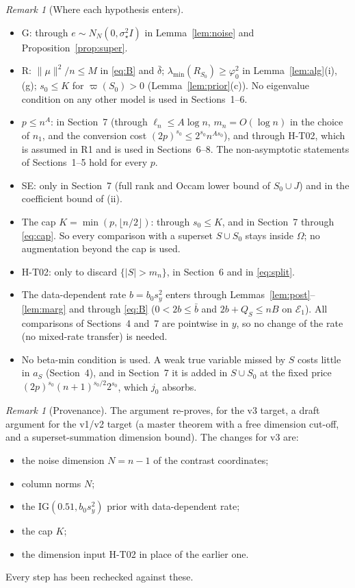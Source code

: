 \documentclass[11pt]{article}
\theoremstyle{remark}
\newtheorem{remark}[theorem]{Remark}
\newcommand{\vp}{\varpi}
\newcommand{\IG}{\mathrm{IG}}
\newcommand{\sst}{\sigma_\star}
\begin{document}
\begin{remark}[Where each hypothesis enters]
\begin{itemize}[leftmargin=1.5em]
\item G: through $e\sim N_N(0,\sst^2I)$ in Lemma~\ref{lem:noise} and Proposition~\ref{prop:super}.
\item R: $\|\mu\|^2/n\le M$ in \eqref{eq:B} and $\bar\delta$; $\lambda_{\min}(R_{S_0})\ge\varphi_0^2$ in Lemma~\ref{lem:alg}(i),(g); $s_0\le K$ for $\vp(S_0)>0$ (Lemma~\ref{lem:prior}(c)). No eigenvalue condition on any other model is used in Sections~1--6.
\item $p\le n^A$: in Section~7 (through $\ell_n\le A\log n$, $m_n=O(\log n)$ in the choice of $n_1$, and the conversion cost $(2p)^{s_0}\le2^{s_0}n^{As_0}$), and through H-T02, which is assumed in R1 and is used in Sections~6--8. The non-asymptotic statements of Sections~1--5 hold for every $p$.
\item SE: only in Section~7 (full rank and Occam lower bound of $S_0\cup J$) and in the coefficient bound of (ii).
\item The cap $K=\min(p,\lfloor n/2\rfloor)$: through $s_0\le K$, and in Section~7 through \eqref{eq:cap}. So every comparison with a superset $S\cup S_0$ stays inside $\Omega$; no augmentation beyond the cap is used.
\item H-T02: only to discard $\{|S|>m_n\}$, in Section~6 and in \eqref{eq:split}.
\item The data-dependent rate $b=b_0s_y^2$ enters through Lemmas~\ref{lem:post}--\ref{lem:marg} and through \eqref{eq:B} ($0<2b\le\bar b$ and $2b+Q_S\le nB$ on $\mathcal E_1$). All comparisons of Sections~4 and~7 are pointwise in $y$, so no change of the rate (no mixed-rate transfer) is needed.
\item No beta-min condition is used. A weak true variable missed by $S$ costs little in $a_S$ (Section~4), and in Section~7 it is added in $S\cup S_0$ at the fixed price $(2p)^{s_0}(n+1)^{s_0/2}2^{s_0}$, which $j_0$ absorbs.
\end{itemize}
\end{remark}

\begin{remark}[Provenance]
The argument re-proves, for the v3 target, a draft argument for the v1/v2 target (a master theorem with a free dimension cut-off, and a superset-summation dimension bound). The changes for v3 are:
\begin{itemize}[leftmargin=1.5em]
\item the noise dimension $N=n-1$ of the contrast coordinates;
\item column norms $N$;
\item the $\IG(0.51,b_0s_y^2)$ prior with data-dependent rate;
\item the cap $K$;
\item the dimension input H-T02 in place of the earlier one.
\end{itemize}
Every step has been rechecked against these.
\end{remark}
\end{document}
